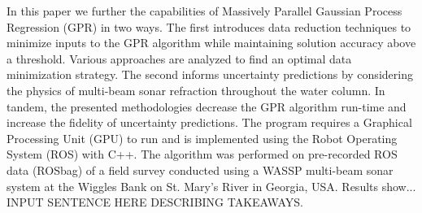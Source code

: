 In this paper we further the capabilities of Massively Parallel Gaussian Process Regression (GPR) in two ways. The first introduces data reduction techniques to minimize inputs to the GPR algorithm while maintaining solution accuracy above a threshold. Various approaches are analyzed to find an optimal data minimization strategy. The second informs uncertainty predictions by considering the physics of multi-beam sonar refraction throughout the water column. In tandem, the presented methodologies decrease the GPR algorithm run-time and increase the fidelity of uncertainty predictions. The program requires a Graphical Processing Unit (GPU) to run and is implemented using the Robot Operating System (ROS) with C++. The algorithm was performed on pre-recorded ROS data (ROSbag) of a field survey conducted using a WASSP multi-beam sonar system at the Wiggles Bank on St. Mary's River in Georgia, USA. Results show... INPUT SENTENCE HERE DESCRIBING TAKEAWAYS. 